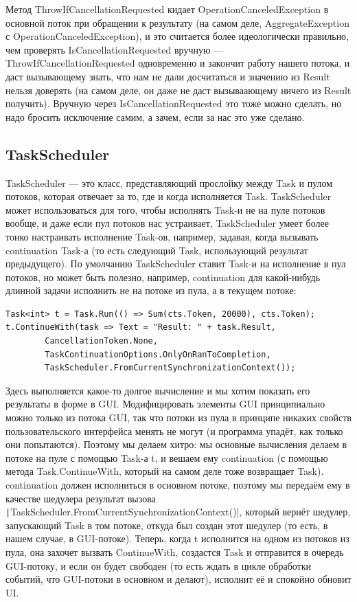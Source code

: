 \documentclass[a5paper]{article}
\begin{document}
Метод ThrowIfCancellationRequested кидает OperationCanceledException в основной поток при обращении к результату (на самом деле, AggregateException с OperationCanceledException), и это считается более идеологически правильно, чем проверять IsCancellationRequested вручную --- ThrowIfCancellationRequested одновременно и закончит работу нашего потока, и даст вызывающему знать, что нам не дали досчитаться и значению из Result нельзя доверять (на самом деле, он даже не даст вызываающему ничего из Result получить). Вручную через IsCancellationRequested это тоже можно сделать, но надо бросить исключение самим, а зачем, если за нас это уже сделано.

\subsection{TaskScheduler}

TaskScheduler --- это класс, представляющий прослойку между Task и пулом потоков, которая отвечает за то, где и когда исполняется Task. TaskScheduler может использоваться для того, чтобы исполнять Task-и не на пуле потоков вообще, и даже если пул потоков нас устраивает, TaskScheduler умеет более тонко настраивать исполнение Task-ов, например, задавая, когда вызывать continuation Task-а (то есть следующий Task, использующий результат предыдущего). По умолчанию TaskScheduler ставит Task-и на исполнение в пул потоков, но может быть полезно, например, continuation для какой-нибудь длинной задачи исполнить не на потоке из пула, а в текущем потоке:

\begin{verbatim}
Task<int> t = Task.Run(() => Sum(cts.Token, 20000), cts.Token);
t.ContinueWith(task => Text = "Result: " + task.Result,
        CancellationToken.None,
        TaskContinuationOptions.OnlyOnRanToCompletion,
        TaskScheduler.FromCurrentSynchronizationContext());
\end{verbatim}

Здесь выполняется какое-то долгое вычисление и мы хотим показать его результаты в форме в GUI. Модифицировать элементы GUI принципиально можно только из потока GUI, так что потоки из пула в принципе никаких свойств пользовательского интерфейса менять не могут (и программа упадёт, как только они попытаются). Поэтому мы делаем хитро: мы основные вычисления делаем в потоке на пуле с помощью Task-а t, и вешаем ему continuation (с помощью метода Task.ContinueWith, который на самом деле тоже возвращает Task). continuation должен исполниться в основном потоке, поэтому мы передаём ему в качестве шедулера результат вызова \texttt|TaskScheduler.FromCurrentSynchronizationContext()|, который вернёт шедулер, запускающий Task в том потоке, откуда был создан этот шедулер (то есть, в нашем случае, в GUI-потоке). Теперь, когда t исполнится на одном из потоков из пула, она захочет вызвать ContinueWith, создастся Task и отправится в очередь GUI-потоку, и если он будет свободен (то есть ждать в цикле обработки событий, что GUI-потоки в основном и делают), исполнит её и спокойно обновит UI.
\end{document}
